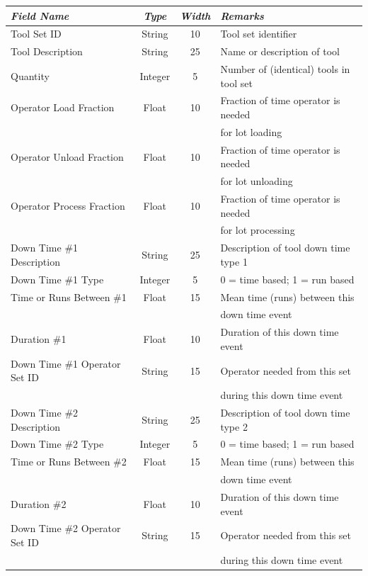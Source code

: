    \begin{center}
   \begin{tabular}{|l|c|c|l|}  \hline
   {\em Field Name} &  {\em Type} & {\em Width } & {\em Remarks} \\ \hline
   Tool Set ID & String & 10 & Tool set identifier \\
   Tool Description & String & 25 & Name or description of tool \\
   Quantity & Integer & 5 & Number of (identical) tools in tool set \\
   Operator Load Fraction & Float & 10 & Fraction of time operator is needed \\
    & & & for lot loading \\
   Operator Unload Fraction & Float & 10 & Fraction of time operator is needed \\
    & & & for lot unloading \\
   Operator Process Fraction & Float & 10 & Fraction of time operator is
   needed \\
    & & & for lot processing \\
   Down Time \#1 Description & String & 25 & Description of tool down time
   type 1 \\
   Down Time \#1 Type & Integer & 5 & 0 = time based; 1 = run based \\
   Time or Runs Between \#1 & Float & 15 & Mean time (runs) between this \\
    & & & down time event \\
   Duration \#1 & Float & 10 & Duration of this down time event \\
   Down Time \#1 Operator Set ID & String & 15 & Operator needed from
    this set\\ 
    & & & during this down time event\\
   Down Time \#2 Description & String & 25 & Description of tool down time
   type 2 \\
   Down Time \#2 Type & Integer & 5 & 0 = time based; 1 = run based \\
   Time or Runs Between \#2 & Float & 15 & Mean time (runs) between this \\
    & & & down time event \\
   Duration \#2 & Float & 10 & Duration of this down time event \\
   Down Time \#2 Operator Set ID & String & 15 & Operator needed from
   this set \\
    & & & during this down time event\\

\end{tabular}
\end{center}
